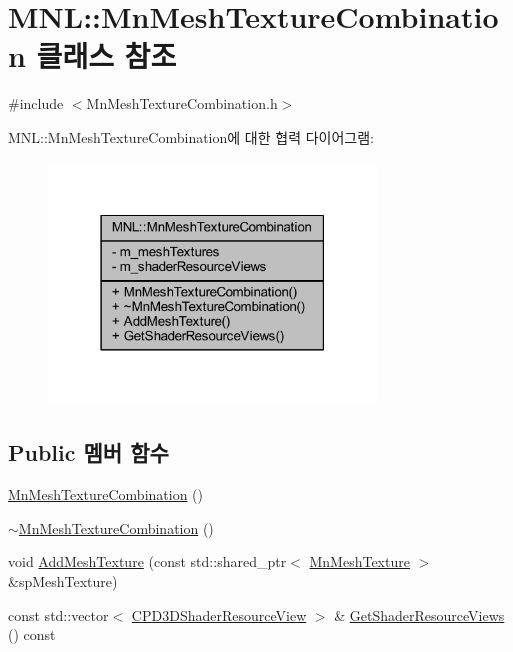 \hypertarget{class_m_n_l_1_1_mn_mesh_texture_combination}{}\section{M\+NL\+:\+:Mn\+Mesh\+Texture\+Combination 클래스 참조}
\label{class_m_n_l_1_1_mn_mesh_texture_combination}


{\ttfamily \#include $<$Mn\+Mesh\+Texture\+Combination.\+h$>$}



M\+NL\+:\+:Mn\+Mesh\+Texture\+Combination에 대한 협력 다이어그램\+:\nopagebreak
\begin{figure}[H]
\begin{center}
\leavevmode
\includegraphics[width=247pt]{class_m_n_l_1_1_mn_mesh_texture_combination__coll__graph}
\end{center}
\end{figure}
\subsection*{Public 멤버 함수}
\begin{DoxyCompactItemize}
\item 
\hyperlink{class_m_n_l_1_1_mn_mesh_texture_combination_ad83519e7ad5c93f11ed7e3a412dafdd8}{Mn\+Mesh\+Texture\+Combination} ()
\item 
\hyperlink{class_m_n_l_1_1_mn_mesh_texture_combination_a651f2956722d41035193c71c27528b52}{$\sim$\+Mn\+Mesh\+Texture\+Combination} ()
\item 
void \hyperlink{class_m_n_l_1_1_mn_mesh_texture_combination_a7f76a68d2b1fb4ac4aad43ff4e70f5e8}{Add\+Mesh\+Texture} (const std\+::shared\+\_\+ptr$<$ \hyperlink{class_m_n_l_1_1_mn_mesh_texture}{Mn\+Mesh\+Texture} $>$ \&sp\+Mesh\+Texture)
\item 
const std\+::vector$<$ \hyperlink{namespace_m_n_l_a93794d93663474ff79c950ed985565aa}{C\+P\+D3\+D\+Shader\+Resource\+View} $>$ \& \hyperlink{class_m_n_l_1_1_mn_mesh_texture_combination_ac9ea285204f40f2808b8697c2738752d}{Get\+Shader\+Resource\+Views} () const
\end{DoxyCompactItemize}
